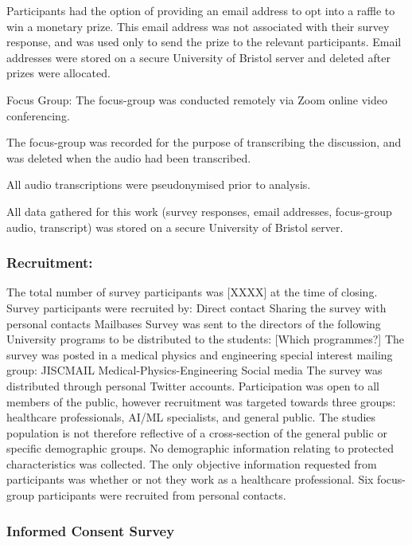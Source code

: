 \documentclass[manuscript,screen,review]{acmart}
\begin{document}
Participants had the option of providing an email address to opt into a raffle to win a monetary prize. 
This email address was not associated with their survey response, and was used only to send the prize to the relevant participants. 
Email addresses were stored on a secure University of Bristol server and deleted after prizes were allocated.  

Focus Group:
The focus-group was conducted remotely via Zoom online video conferencing. 

The focus-group was recorded for the purpose of transcribing the discussion, and was deleted when the audio had been transcribed. 

All audio transcriptions were pseudonymised prior to analysis.

All data gathered for this work (survey responses, email addresses, focus-group audio, transcript) was stored on a secure University of Bristol server. 

\subsubsection{Recruitment:}  


The total number of survey participants was [XXXX] at the time of closing.
Survey participants were recruited by:
Direct contact
Sharing the survey with personal contacts
Mailbases 
Survey was sent to the directors of the following University programs to be  distributed to the students:
[Which programmes?]
The survey was posted in a medical physics and engineering special interest mailing group: JISCMAIL Medical-Physics-Engineering 
Social media
The survey was distributed through personal Twitter accounts.
Participation was open to all members of the public, however recruitment was targeted towards three groups: healthcare professionals, AI/ML specialists, and general public. The studies population is not therefore reflective of a cross-section of the general public or specific demographic groups. 
No demographic information relating to protected characteristics was collected. 
The only objective information requested from participants was whether or not they work as a healthcare professional. 
Six focus-group participants were recruited from personal contacts. 

\subsubsection{Informed Consent Survey}  
\end{document}
